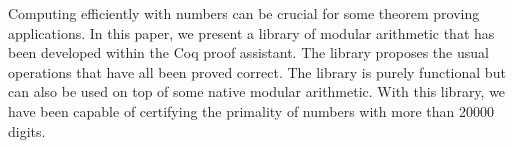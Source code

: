 Computing efficiently with numbers can be crucial for some theorem proving applications.
In this paper, we present a library of modular arithmetic that has been developed within
the {\sc Coq} proof assistant. The library proposes the usual operations that have all been
proved correct. The library is purely functional but can also be used on top of some native
modular arithmetic. 
With this library, we have been capable of certifying the primality of numbers with
more than 20000 digits.

